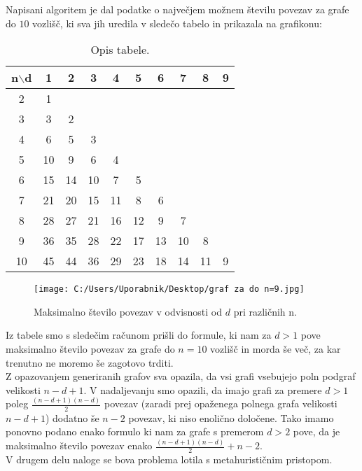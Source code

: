 \documentclass[12pt,a4paper]{amsart}
\theoremstyle{definition} %
\theoremstyle{plain} %
\begin{document}
Napisani algoritem je dal podatke o največjem možnem številu povezav za grafe do $10$ vozlišč,
ki sva jih uredila v sledečo tabelo in prikazala na grafikonu:

\begin{table}[h]
    \centering
    \begin{tabular}{|c|c|c|c|c|c|c|c|c|c|} 
    \hline
    \multicolumn{1}{|c|}{\textbf{n$\backslash$d}} & \textbf{1} & \textbf{2} & \textbf{3} & \textbf{4} & \textbf{5} & \textbf{6} & \textbf{7} & \textbf{8} & \textbf{9} \\ 
    \hline
    2 & 1 & & & & & & & & \\ 
    3 & 3 & 2 & & & & & & & \\ 
    4 & 6 & 5 & 3 & & & & & & \\
    5 & 10 & 9 & 6 & 4 & & & & & \\
    6 & 15 & 14 & 10 & 7 & 5 & & & & \\ 
    7 & 21 & 20 & 15 & 11 & 8 & 6 & & & \\ 
    8 & 28 & 27 & 21 & 16 & 12 & 9 & 7 & & \\ 
    9 & 36 & 35 & 28 & 22 & 17 & 13 & 10 & 8 & \\ 
    10 & 45 & 44 & 36 & 29 & 23 & 18 & 14 & 11 & 9 \\ 
    \hline
    \end{tabular}
    \caption{Opis tabele.}
    \label{tab:tabela1}
\end{table}

\begin{figure}[h]
    \centering
    \texttt{[image: C:/Users/Uporabnik/Desktop/graf za do n=9.jpg]}
    \caption{Maksimalno število povezav v odvisnosti od \(d\) pri različnih n.}
    \label{fig:slika1}
\end{figure}

\pagebreak


Iz tabele smo s sledečim računom prišli do formule, ki nam za $d > 1$ pove maksimalno število povezav za
grafe do $n = 10$ vozlišč in morda še več, za kar trenutno ne moremo še zagotovo trditi.\\


Z opazovanjem generiranih grafov sva opazila, da vsi grafi vsebujejo poln podgraf velikosti $n - d + 1$.
V nadaljevanju smo opazili, da imajo grafi za premere $d > 1$ poleg $\frac{(n - d + 1)(n - d)}{2}$ povezav (zaradi
prej opaženega polnega grafa velikosti $n - d + 1$) dodatno še $n - 2$ povezav, ki niso enolično določene.
Tako imamo ponovno podano enako formulo ki nam za grafe s premerom $d > 2$ pove, da je maksimalno število
povezav enako $\frac{(n - d + 1)(n - d)}{2} + n - 2$.\\


V drugem delu naloge se bova problema lotila s metahurističnim pristopom.
\end{document}
